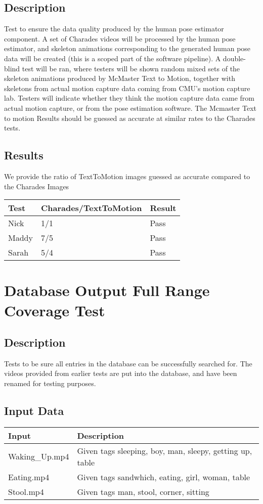 \documentclass{scrreprt}
\begin{document}
\subsection{Description}
\begin{flushleft}
Test to ensure the data quality produced by the human pose estimator component. A set of Charades videos will be processed by the human pose estimator, and skeleton animations corresponding to the generated human pose data will be created (this is a scoped part of the software pipeline). A double-blind test will be ran, where testers will be shown random mixed sets of the skeleton animations produced by McMaster Text to Motion, together with skeletons from actual motion capture data coming from CMU’s motion capture lab. Testers will indicate whether they think the motion capture data came from actual motion capture, or from the pose estimation software. The Mcmaster Text to motion Results should be guessed as accurate at similar rates to the Charades tests.
\subsection{Results}
We provide the ratio of TextToMotion images guessed as accurate compared to the Charades Images
\end{flushleft}
 \centering
 \begin{tabular}{||p{2.5cm}|p{2.5cm}|p{2.5cm}||}
 \hline
 \textbf Test & \textbf Charades/TextToMotion & \textbf Result\\
 \hline\hline
  Nick &  1/1 & Pass\\
 \hline
 Maddy &  7/5  & Pass\\
 \hline
 Sarah & 5/4 & Pass\\
 \hline
 \end{tabular}

\section{Database Output Full Range Coverage Test}
\subsection{Description}
\begin{flushleft}
Tests to be sure all entries in the database can be successfully searched for. The videos provided from earlier tests are put into the database, and have been renamed for testing purposes.
\end{flushleft}
\subsection{Input Data}
 \centering
 \begin{tabular}{p{3cm}p{6cm}}
 \hline\hline
 Input & Description\\
 \hline\hline
  Waking_Up.mp4 &  Given tags sleeping, boy, man, sleepy, getting up, table\\
 \hline
 Eating.mp4 &  Given tags sandwhich, eating, girl, woman, table\\
 \hline
 Stool.mp4 &  Given tags man, stool, corner, sitting\\
 \hline
 \end{tabular}
\end{document}

